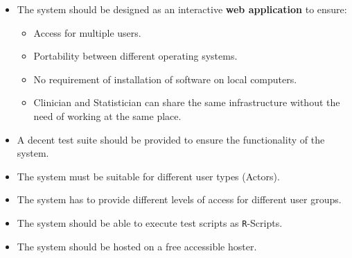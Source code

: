 \begin{itemize}
	\item The system should be designed as an interactive \textbf{web application} to ensure:
	\begin{itemize}
		\item Access for multiple users.
		\item Portability between different operating systems.
		\item No requirement of installation of software on local computers.
		\item Clinician and Statistician can share the same infrastructure without the need of working at the same place.
	\end{itemize}
	\item A decent test suite should be provided to ensure the functionality of the system.
	\item The system must be suitable for different user types (\glspl{Actor}).
	\item The system has to provide different levels of access for different user groups.
	\item The system should be able to execute test scripts as \texttt{R}-Scripts.
	\item The system should be hosted on a free accessible hoster.
\end{itemize}

